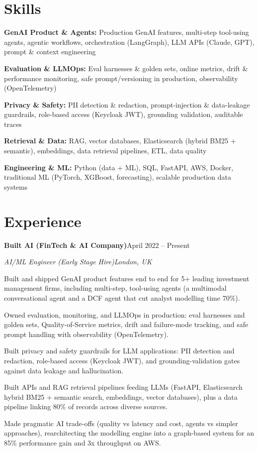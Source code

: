 \documentclass[10pt,a4paper]{article}
\newcommand{\entry}[4]{%
  {\color{company}\bfseries #1}\hfill {\color{muted}#2}\par
  \vspace{1pt}
  {\itshape #3}\hfill {\color{muted}\itshape #4}\par
  \vspace{3pt}%
}
\begin{document}
\section{Skills}
\begin{tight}
  \item[\textcolor{accent}{\small$\bullet$}] \textbf{GenAI Product \& Agents:} Production GenAI features, multi-step tool-using agents, agentic workflows, orchestration (LangGraph), LLM APIs (Claude, GPT), prompt \& context engineering
  \item[\textcolor{accent}{\small$\bullet$}] \textbf{Evaluation \& LLMOps:} Eval harnesses \& golden sets, online metrics, drift \& performance monitoring, safe prompt/versioning in production, observability (OpenTelemetry)
  \item[\textcolor{accent}{\small$\bullet$}] \textbf{Privacy \& Safety:} PII detection \& redaction, prompt-injection \& data-leakage guardrails, role-based access (Keycloak JWT), grounding validation, auditable traces
  \item[\textcolor{accent}{\small$\bullet$}] \textbf{Retrieval \& Data:} RAG, vector databases, Elasticsearch (hybrid BM25 + semantic), embeddings, data retrieval pipelines, ETL, data quality
  \item[\textcolor{accent}{\small$\bullet$}] \textbf{Engineering \& ML:} Python (data + ML), SQL, FastAPI, AWS, Docker, traditional ML (PyTorch, XGBoost, forecasting), scalable production data systems
\end{tight}

\section{Experience}
\entry{Built AI (FinTech \& AI Company)}{April 2022 -- Present}{AI/ML Engineer (Early Stage Hire)}{London, UK}
\begin{tight}
  \item Built and shipped GenAI product features end to end for 5+ leading investment management firms, including multi-step, tool-using agents (a multimodal conversational agent and a DCF agent that cut analyst modelling time 70\%).
  \item Owned evaluation, monitoring, and LLMOps in production: eval harnesses and golden sets, Quality-of-Service metrics, drift and failure-mode tracking, and safe prompt handling with observability (OpenTelemetry).
  \item Built privacy and safety guardrails for LLM applications: PII detection and redaction, role-based access (Keycloak JWT), and grounding-validation gates against data leakage and hallucination.
  \item Built APIs and RAG retrieval pipelines feeding LLMs (FastAPI, Elasticsearch hybrid BM25 + semantic search, embeddings, vector databases), plus a data pipeline linking 80\% of records across diverse sources.
  \item Made pragmatic AI trade-offs (quality vs latency and cost, agents vs simpler approaches), rearchitecting the modelling engine into a graph-based system for an 85\% performance gain and 3x throughput on AWS.
\end{tight}
\end{document}
